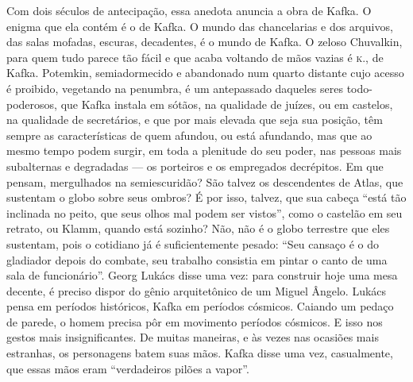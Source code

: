 Com dois séculos de antecipação, essa anedota anuncia a obra de Kafka. O
enigma que ela contém é o de Kafka. O mundo das chancelarias e dos
arquivos, das salas mofadas, escuras, decadentes, é o mundo de Kafka. O
zeloso Chuvalkin, para quem tudo parece tão fácil e que acaba voltando
de mãos vazias é \textsc{k.}, de Kafka. Potemkin, semiadormecido e abandonado
num quarto distante cujo acesso é proibido, vegetando na penumbra, é um
antepassado daqueles seres todo-poderosos, que Kafka instala em sótãos,
na qualidade de juízes, ou em castelos, na qualidade de secretários, e
que por mais elevada que seja sua posição, têm sempre as características
de quem afundou, ou está afundando, mas que ao mesmo tempo podem surgir,
em toda a plenitude do seu poder, nas pessoas mais subalternas e
degradadas --- os porteiros e os empregados decrépitos. Em que pensam,
mergulhados na semiescuridão? São talvez os descendentes de Atlas, que
sustentam o globo sobre seus ombros? É por isso, talvez, que sua cabeça
``está tão inclinada no peito, que seus olhos mal podem ser vistos'',
como o castelão em seu retrato, ou Klamm, quando está sozinho? Não, não
é o globo terrestre que eles sustentam, pois o cotidiano já é
suficientemente pesado: ``Seu cansaço é o do gladiador depois do
combate, seu trabalho consistia em pintar o canto de uma sala de
funcionário''. Georg Lukács disse uma vez: para construir hoje uma mesa
decente, é preciso dispor do gênio arquitetônico de um Miguel Ângelo.
Lukács pensa em períodos históricos, Kafka em períodos cósmicos. Caiando
um pedaço de parede, o homem precisa pôr em movimento períodos cósmicos.
E isso nos gestos mais insignificantes. De muitas maneiras, e às vezes
nas ocasiões mais estranhas, os personagens batem suas mãos. Kafka disse
uma vez, casualmente, que essas mãos eram ``verdadeiros pilões a
vapor''.


